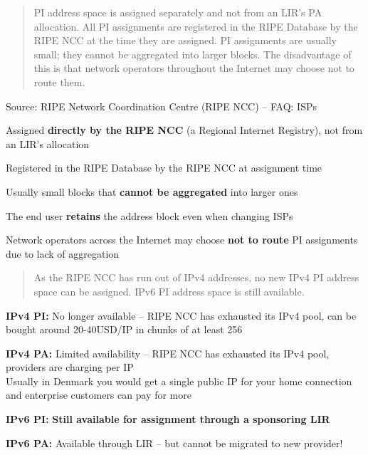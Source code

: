 \documentclass[Screen16to9,17pt]{foils}
\begin{document}

\begin{quote}
PI address space is assigned separately and not from an LIR's PA allocation. All PI
assignments are registered in the RIPE Database by the RIPE NCC at the time they are
assigned. PI assignments are usually small; they cannot be aggregated into larger blocks.
The disadvantage of this is that network operators throughout the Internet may choose
not to route them.
\end{quote}
Source: RIPE Network Coordination Centre (RIPE NCC) -- FAQ: ISPs\\

\begin{list2}
  \item Assigned {\bf directly by the RIPE NCC} (a Regional Internet Registry),
        not from an LIR's allocation
  \item Registered in the RIPE Database by the RIPE NCC at assignment time
  \item Usually small blocks that {\bf cannot be aggregated} into larger ones
  \item The end user {\bf retains} the address block even when changing ISPs
  \item Network operators across the Internet may choose {\bf not to route} PI
        assignments due to lack of aggregation
\end{list2}


\begin{quote}
As the RIPE NCC has run out of IPv4 addresses, no new IPv4 PI address space can be
assigned. IPv6 PI address space is still available.
\end{quote}

\begin{list2}
  \item {\bf IPv4 PI:} No longer available -- RIPE NCC has exhausted its IPv4 pool, can be bought around 20-40USD/IP in chunks of at least 256
  \item {\bf IPv4 PA:} Limited availability -- RIPE NCC has exhausted its IPv4 pool, providers are charging per IP\\
  Usually in Denmark you would get a single public IP for your home connection and enterprise customers can pay for more
  \item {\bf IPv6 PI:} {\bf Still available for assignment through a sponsoring LIR}
  \item {\bf IPv6 PA:} Available through LIR -- but cannot be migrated to new provider!
\end{list2}
\end{document}
